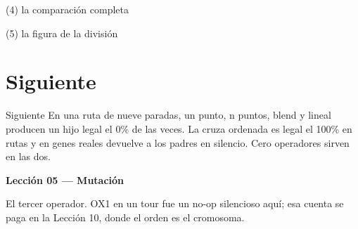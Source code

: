 \begin{frame}[fragile]{(4) la comparación completa}

\end{frame}

\begin{frame}[fragile]{(5) la figura de la división}

\end{frame}


\section{Siguiente}

\begin{frame}{Siguiente}
En una ruta de nueve paradas, un punto, n puntos, blend y lineal producen un hijo legal el 0\% de las veces. La cruza ordenada es legal el 100\% en rutas y en genes reales devuelve a los padres en silencio. Cero operadores sirven en las dos.

\vspace{0.8em}
\textbf{Lección 05 --- Mutación}

El tercer operador. OX1 en un tour fue un no-op silencioso aquí; esa cuenta se paga en la Lección 10, donde el orden es el cromosoma.
\end{frame}

